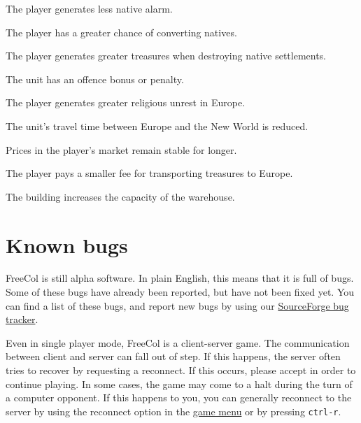 \documentclass[12pt]{book}
\begin{document}
\affectsPlayer

The player generates less native alarm.

\affectsPlayer

The player has a greater chance of converting natives.

\affectsPlayer

The player generates greater treasures when destroying native settlements.

\affectsUnit

The unit has an offence bonus or penalty.

\affectsPlayer

The player generates greater religious unrest in Europe.

\affectsUnit

The unit's travel time between Europe and the New World is reduced.

\affectsPlayer

Prices in the player's market remain stable for longer.

\affectsPlayer

The player pays a smaller fee for transporting treasures to Europe.

\affectsBuilding

The building increases the capacity of the warehouse.




\hypertarget{Known bugs}{\chapter{Known bugs}}

FreeCol is still alpha software. In plain English, this means that it
is full of bugs. Some of these bugs have already been reported, but
have not been fixed yet. You can find a list of these bugs, and report
new bugs by using our
\href{http://sourceforge.net/tracker/?group_id=43225&atid=435578}{SourceForge
bug tracker}.

Even in single player mode, FreeCol is a client-server game. The
communication between client and server can fall out of step. If this
happens, the server often tries to recover by requesting a
reconnect. If this occurs, please accept in order to continue
playing. In some cases, the game may come to a halt during the turn of
a computer opponent. If this happens to you, you can generally
reconnect to the server by using the reconnect option in the
\hyperlink{game menu}{game menu} or by pressing \verb$ctrl-r$.
\end{document}
